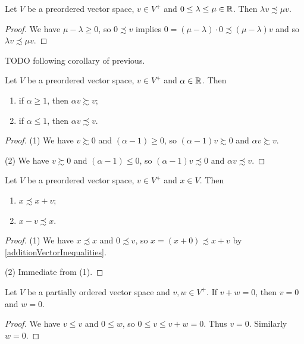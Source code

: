 \begin{lemma} \label{scalarInequalityImpliesVectorInequality}
Let $V$ be a preordered vector space, $v\in V^+$ and $0\leq \lambda \leq \mu\in \mathbb{R}$. Then $\lambda v \precsim \mu v$.
\end{lemma}
\begin{proof}
We have $\mu-\lambda \geq 0$, so $0\precsim v$ implies $0 = (\mu-\lambda)\cdot 0 \precsim (\mu-\lambda)v$ and so $\lambda v \precsim \mu v$.
\end{proof}
TODO following corollary of previous.
\begin{lemma} \label{scalarMultiplicationInequalities}
Let $V$ be a preordered vector space, $v\in V^+$ and $\alpha\in \mathbb{R}$. Then
\begin{enumerate}
\item if $\alpha \geq 1$, then $\alpha v \succsim v$;
\item if $\alpha \leq 1$, then $\alpha v \precsim v$.
\end{enumerate}
\end{lemma}
\begin{proof}
(1) We have $v\succsim 0$ and $(\alpha-1) \geq 0$, so $(\alpha-1)v \succsim 0$ and $\alpha v \succsim v$.

(2) We have $v\succsim 0$ and $(\alpha-1) \leq 0$, so $(\alpha-1)v \precsim 0$ and $\alpha v \precsim v$.
\end{proof}

\begin{lemma} \label{positiveVectorAddition}
Let $V$ be a preordered vector space, $v\in V^+$ and $x\in V$. Then
\begin{enumerate}
\item $x \precsim x+v$;
\item $x - v \precsim x$.
\end{enumerate}
\end{lemma}
\begin{proof}
(1) We have $x\precsim x$ and $0\precsim v$, so $x = (x+0)\precsim x+v$ by \ref{additionVectorInequalities}.

(2) Immediate from (1).
\end{proof}

\begin{lemma} \label{positiveElementsSumToZeroImpliesZero}
Let $V$ be a partially ordered vector space and $v,w\in V^+$. If $v+w = 0$, then $v = 0$ and $w = 0$.
\end{lemma}
\begin{proof}
We have $v \leq v$ and $0\leq w$, so $0\leq v\leq v+w = 0$. Thus $v = 0$. Similarly $w = 0$.
\end{proof}

